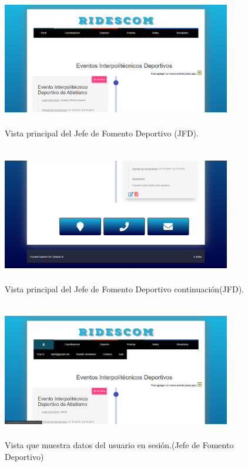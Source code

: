 		\begin{figure} [hbt!]
			\centering
			\includegraphics[width=10cm, height=6cm]{Imagenes/Vistas/Vista3_PrincipalJFD}
			\caption{Vista principal del Jefe de Fomento Deportivo (JFD).}
			\label{VistaPrincipalJFD}
		\end{figure}
			
		\begin{figure} [hbt!]
			\centering
			\includegraphics[width=10cm, height=6cm]{Imagenes/Vistas/Vista4_PrincipalJFD}
			\caption{Vista principal del Jefe de Fomento Deportivo continuación(JFD).}
			\label{VIstaPrincipalJFD1}
		\end{figure}
	
		\begin{figure} [hbt!]
			\centering
			\includegraphics[width=10cm, height=6cm]{Imagenes/Vistas/Vista5_MenuUsuarioJFD}
			\caption{Vista que muestra datos del usuario en sesión.(Jefe de Fomento Deportivo)}
			\label{VistaMenuUsuario}
		\end{figure}
		
